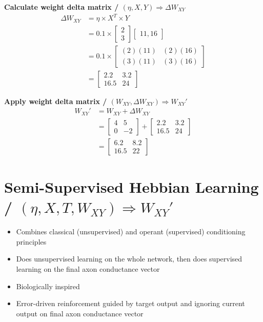 \documentclass[12 pt]{article}
\begin{document}
	\textbf{Calculate weight delta matrix / $(\eta, X, Y) \Rightarrow \Delta W_{XY}$}
	\begin{align*}
		\Delta W_{XY} &= \eta \times X^T \times Y\\
		&= 0.1 \times \begin{bmatrix}2\\3\end{bmatrix} \begin{bmatrix}11,16\end{bmatrix}\\
		&= 0.1 \times \begin{bmatrix}(2)(11) & (2)(16)\\(3)(11) & (3)(16)\end{bmatrix}\\
		&= \begin{bmatrix}2.2 & 3.2\\16.5 & 24\end{bmatrix}
	\end{align*}
	
	\textbf{Apply weight delta matrix / $(W_{XY}, \Delta W_{XY}) \Rightarrow W_{XY}'$}
	\begin{align*}
		W_{XY}' &= W_{XY} + \Delta W_{XY}\\
		&= \begin{bmatrix}4 & 5\\0 & -2\end{bmatrix} + \begin{bmatrix}2.2 & 3.2\\16.5 & 24\end{bmatrix}\\
		&= \begin{bmatrix}6.2 & 8.2\\16.5 & 22\end{bmatrix}
	\end{align*}

\newpage\thispagestyle{empty}
\section*{Semi-Supervised Hebbian Learning / $(\eta, X, T, W_{XY}) \Rightarrow W_{XY}'$}

	\begin{itemize}
		\item Combines classical (unsupervised) and operant (supervised) conditioning principles
		\item Does unsupervised learning on the whole network, then does supervised learning on the final axon conductance vector
		\item Biologically inspired
		\item Error-driven reinforcement guided by target output and ignoring current output on final axon conductance vector
	\end{itemize}
\end{document}

